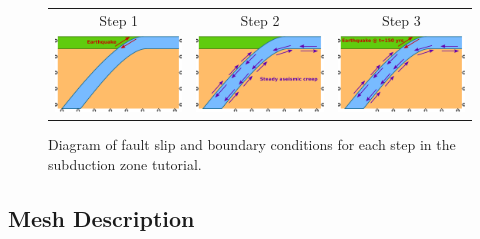 \begin{figure}
\begin{centering}
\begin{tabular}{ccc}
Step 1 & Step 2 & Step 3\tabularnewline
\includegraphics[width=2in]{tutorials/subduction/figs/step01} & \includegraphics[width=2in]{tutorials/subduction/figs/step02} & \includegraphics[width=2in]{tutorials/subduction/figs/step03}\tabularnewline
\end{tabular}
\par\end{centering}

\caption{Diagram of fault slip and boundary conditions for each step in the
subduction zone tutorial.\label{fig:tutorial:subduction:steps}}
\end{figure}



\subsection{Mesh Description}


